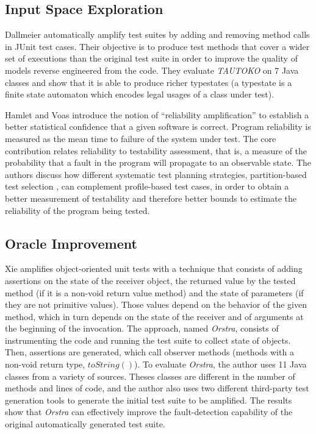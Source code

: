 \subsection{Input Space Exploration}
\label{subsec:sota:category-4:input-exploration}

Dallmeier \etal\cite{Dallmeier2010} automatically amplify test suites by adding and removing method calls in JUnit test cases. 
Their objective is to produce test methods that cover a wider set of executions than the original test suite in order to improve the quality of models reverse engineered from the code. 
They evaluate \emph{TAUTOKO} on 7 Java classes and show that it is able to produce richer typestates (a typestate is a finite state automaton which encodes legal usages of a class under test).

Hamlet and Voas \cite{HamletV93} introduce the notion of ``reliability amplification'' to establish a better statistical confidence that a given software is correct. 
Program reliability is measured as the mean time to failure of the system under test.
The core contribution relates reliability to testability assessment, that is, a measure of the probability that a fault in the program will propagate to an observable state. 
The authors discuss how different systematic test planning strategies, \eg partition-based test selection \cite{ostrand1988category}, can complement profile-based test cases, in order to obtain a better measurement of testability and therefore better bounds to estimate the reliability of the program being tested.

\subsection{Oracle Improvement}
\label{subsec:sota:category-4:oracle-improvement}

Xie \cite{Xie2006} amplifies object-oriented unit tests with a technique that consists of adding assertions on the state of the receiver object, the returned value by the tested method (if it is a non-void return value method) and the state of parameters (if they are not primitive values). 
Those values depend on the behavior of the given method, which in turn depends on the state of the receiver and of arguments at the beginning of the invocation. 
The approach, named \emph{Orstra}, consists of instrumenting the code and running the test suite to collect state of objects. 
Then, assertions are generated, which call observer methods (methods with a non-void return type, \eg $toString()$). 
To evaluate \emph{Orstra}, the author uses 11 Java classes from a variety of sources. 
Theses classes are different in the number of methods and lines of code, and the author also uses two different third-party test generation tools to generate the initial test suite to be amplified. 
The results show that \emph{Orstra} can effectively improve the fault-detection capability of the original automatically generated test suite.

